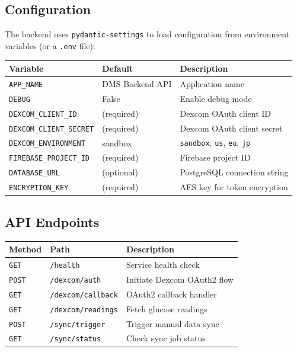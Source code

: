 \documentclass[12pt,a4paper]{article}
\begin{document}
\subsection{Configuration}

The backend uses \texttt{pydantic-settings} to load configuration from environment variables (or a \texttt{.env} file):

\begin{longtable}{p{5cm} p{3cm} p{6cm}}
\toprule
\textbf{Variable} & \textbf{Default} & \textbf{Description} \\
\midrule
\endhead
\texttt{APP\_NAME} & DMS Backend API & Application name \\
\texttt{DEBUG} & False & Enable debug mode \\
\texttt{DEXCOM\_CLIENT\_ID} & (required) & Dexcom OAuth client ID \\
\texttt{DEXCOM\_CLIENT\_SECRET} & (required) & Dexcom OAuth client secret \\
\texttt{DEXCOM\_ENVIRONMENT} & sandbox & \texttt{sandbox}, \texttt{us}, \texttt{eu}, \texttt{jp} \\
\texttt{FIREBASE\_PROJECT\_ID} & (required) & Firebase project ID \\
\texttt{DATABASE\_URL} & (optional) & PostgreSQL connection string \\
\texttt{ENCRYPTION\_KEY} & (required) & AES key for token encryption \\
\bottomrule
\end{longtable}

\subsection{API Endpoints}

\begin{longtable}{p{2cm} p{5.5cm} p{6.5cm}}
\toprule
\textbf{Method} & \textbf{Path} & \textbf{Description} \\
\midrule
\endhead
\texttt{GET} & \texttt{/health} & Service health check \\
\texttt{POST} & \texttt{/dexcom/auth} & Initiate Dexcom OAuth2 flow \\
\texttt{GET} & \texttt{/dexcom/callback} & OAuth2 callback handler \\
\texttt{GET} & \texttt{/dexcom/readings} & Fetch glucose readings \\
\texttt{POST} & \texttt{/sync/trigger} & Trigger manual data sync \\
\texttt{GET} & \texttt{/sync/status} & Check sync job status \\
\bottomrule
\end{longtable}
\end{document}
